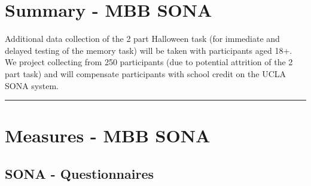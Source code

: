 \documentclass[]{book}
\begin{document}
\hypertarget{summary---mbb-sona}{%
\section{Summary - MBB SONA}\label{summary---mbb-sona}}

Additional data collection of the 2 part Halloween task (for immediate and delayed testing of the memory task) will be taken with participants aged 18+. We project collecting from 250 participants (due to potential attrition of the 2 part task) and will compensate participants with school credit on the UCLA SONA system.

\begin{center}\rule{0.5\linewidth}{0.5pt}\end{center}

\hypertarget{measures---mbb-sona}{%
\section{Measures - MBB SONA}\label{measures---mbb-sona}}

\hypertarget{sona---questionnaires}{%
\subsection{SONA - Questionnaires}\label{sona---questionnaires}}
\end{document}
